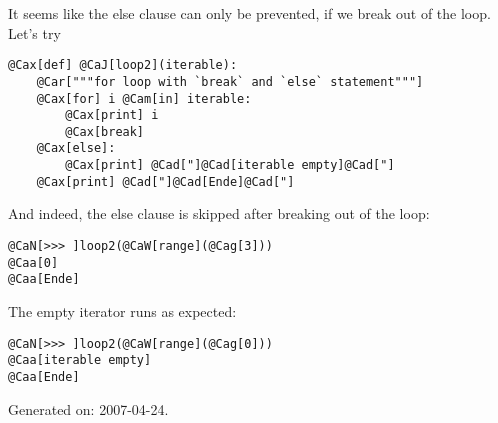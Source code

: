 \documentclass[10pt,a4paper,english]{article}
\begin{document}
It seems like the else clause can only be prevented, if we break out of
the loop. Let's try
\begin{Verbatim}[commandchars=@\[\]]
@Cax[def] @CaJ[loop2](iterable):
    @Car["""for loop with `break` and `else` statement"""]
    @Cax[for] i @Cam[in] iterable:
        @Cax[print] i
        @Cax[break]
    @Cax[else]:
        @Cax[print] @Cad["]@Cad[iterable empty]@Cad["]
    @Cax[print] @Cad["]@Cad[Ende]@Cad["]

\end{Verbatim}

And indeed, the else clause is skipped after breaking out of the loop:
\begin{Verbatim}[commandchars=@\[\]]
@CaN[>>> ]loop2(@CaW[range](@Cag[3]))
@Caa[0]
@Caa[Ende]

\end{Verbatim}

The empty iterator runs as expected:
\begin{Verbatim}[commandchars=@\[\]]
@CaN[>>> ]loop2(@CaW[range](@Cag[0]))
@Caa[iterable empty]
@Caa[Ende]

\end{Verbatim}

\begin{center}\small

Generated on: 2007-04-24.


\end{center}
\end{document}
